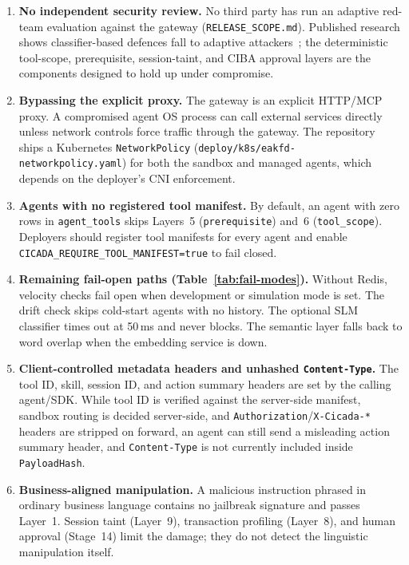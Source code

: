 \documentclass[11pt, a4paper]{article}
\begin{document}
\begin{enumerate}[label=\arabic*., leftmargin=2em]
    \item \textbf{No independent security review.} No third party has run an adaptive red-team evaluation against the gateway (\texttt{RELEASE\_SCOPE.md}). Published research shows classifier-based defences fall to adaptive attackers~\cite{nasr2025}; the deterministic tool-scope, prerequisite, session-taint, and CIBA approval layers are the components designed to hold up under compromise.
    \item \textbf{Bypassing the explicit proxy.} The gateway is an explicit HTTP/MCP proxy. A compromised agent OS process can call external services directly unless network controls force traffic through the gateway. The repository ships a Kubernetes \texttt{NetworkPolicy} (\texttt{deploy/k8s/eakfd-networkpolicy.yaml}) for both the sandbox and managed agents, which depends on the deployer's CNI enforcement.
    \item \textbf{Agents with no registered tool manifest.} By default, an agent with zero rows in \texttt{agent\_tools} skips Layers~5 (\texttt{prerequisite}) and~6 (\texttt{tool\_scope}). Deployers should register tool manifests for every agent and enable \texttt{CICADA\_REQUIRE\_TOOL\_MANIFEST=true} to fail closed.
    \item \textbf{Remaining fail-open paths (Table~\ref{tab:fail-modes}).} Without Redis, velocity checks fail open when development or simulation mode is set. The drift check skips cold-start agents with no history. The optional SLM classifier times out at 50\,ms and never blocks. The semantic layer falls back to word overlap when the embedding service is down.
    \item \textbf{Client-controlled metadata headers and unhashed \texttt{Content-Type}.} The tool ID, skill, session ID, and action summary headers are set by the calling agent/SDK. While tool ID is verified against the server-side manifest, sandbox routing is decided server-side, and \texttt{Authorization}/\texttt{X-Cicada-*} headers are stripped on forward, an agent can still send a misleading action summary header, and \texttt{Content-Type} is not currently included inside \texttt{PayloadHash}.
    \item \textbf{Business-aligned manipulation.} A malicious instruction phrased in ordinary business language contains no jailbreak signature and passes Layer~1. Session taint (Layer~9), transaction profiling (Layer~8), and human approval (Stage~14) limit the damage; they do not detect the linguistic manipulation itself.

\end{enumerate}
\end{document}
